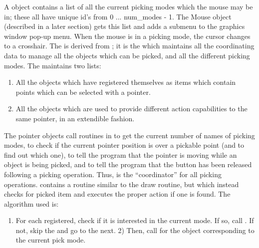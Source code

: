 A  object contains a list of all the current picking modes which the mouse may be in; these all have unique id's from 0 ... num\_modes - 1.  The Mouse object (described in a later section) gets this list and adds a submenu to the graphics window pop-up menu.  When the mouse is in a picking mode, the cursor changes to a crosshair.  The  is derived from ; it is the  which maintains all the coordinating data to manage all the objects which can be picked, and all the different picking modes.  The  maintains two lists:
\begin{enumerate}
  \item All the  objects which have registered themselves as items which contain points which can be selected with a pointer.
  \item All the  objects which are used to provide different action capabilities to the same pointer, in an extendible fashion.
\end{enumerate}
The pointer objects call routines in  to get the current number of names of picking modes, to check if the current pointer position is over a pickable point (and to find out which one), to tell the program that the pointer is moving while an object is being picked, and to tell the program that the button has been released following a picking operation.  Thus,  is the ``coordinator'' for all picking operations.   contains a routine similar to the draw routine, but which instead checks for picked item and executes the proper action if one is found.  The algorithm used is:
\begin{enumerate}
  \item For each  registered,  check if it is interested in the current mode.  If so, call .  If not, skip the  and go to the next.
	2) Then, call  for the  object corresponding to the current pick mode.
\end{enumerate}

